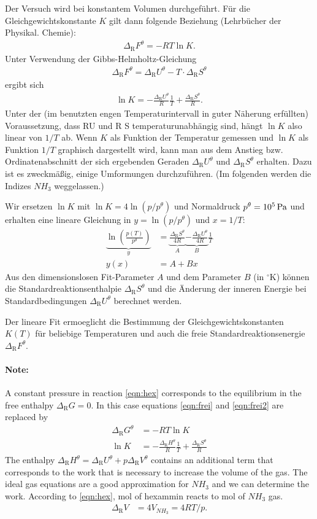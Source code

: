 \documentclass[english,twocolumn,DIV21,a4,10pt]{scrartcl}
\newcommand{\dr}{\Delta_\textrm{R}}
\begin{document}
Der Versuch wird bei konstantem Volumen durchgeführt. Für die
Gleichgewichtskonstante $K$ gilt dann folgende Beziehung (Lehrbücher
der Physikal. Chemie):
\begin{align}
  \label{eqn:frei}
  \dr F^\theta = -RT\ln K.
\end{align}
Unter Verwendung der Gibbs-Helmholtz-Gleichung
\begin{align}
  \label{eqn:frei2}
  \dr F^\theta = \dr U^\theta - T \cdot \dr S^\theta
\end{align}
ergibt sich
\begin{align}
  \ln K = -\frac{\dr U^\theta}{R}\frac{1}{T} + \frac{\dr S^\theta}{R}.
\end{align}
Unter der (im benutzten engen Temperaturintervall in guter Näherung
erfüllten) Voraussetzung, dass RU und R S temperaturunabhängig sind,
hängt $\ln K$ also linear von $1/T$ ab. Wenn $K$ als Funktion der
Temperatur gemessen und $\ln K$ als Funktion $1/T$ graphisch
dargestellt wird, kann man aus dem Anstieg bzw. Ordinatenabschnitt der
sich ergebenden Geraden $\dr U^\theta$ und $\dr S^\theta$
erhalten. Dazu ist es zweckmäßig, einige Umformungen
durchzuführen. (Im folgenden werden die Indizes $NH_3$ weggelassen.)

Wir ersetzen $\ln K$ mit $\ln K=4\ln(p/p^\theta)$ und Normaldruck
$p^\theta = \unit[10^5]{Pa}$ und erhalten eine lineare Gleichung in $y
= \ln(p/p^\theta)$ und $x=1/T$:
\begin{align}
  \label{eqn:fit}
  \underbrace{\ln \left(\frac{p(T)}{p^\theta}\right)}_y &= 
  \underbrace{\frac{\dr S^\theta}{4R}}_A \underbrace{-\frac{\dr U^\theta}{4R}}_B
  \frac{1}{T} \\
  y(x) &= A+B x
\end{align}
Aus den dimensionslosen Fit-Parameter $A$ und dem Parameter $B$ (in
${}^\circ\textrm{K}$) können die Standardreaktionsenthalpie $\dr
S^\theta$ und die \"Anderung der inneren Energie bei
Standardbedingungen $\dr U^\theta$ berechnet werden.

Der lineare Fit ermoeglicht die Bestimmung der
Gleichgewichtskonstanten $K(T)$ f\"ur beliebige Temperaturen und auch
die freie Standardreaktionsenergie $\dr F^\theta$.

\paragraph{Note:}
A constant pressure in reaction \ref{eqn:hex} corresponds to the
equilibrium in the free enthalpy $\dr G=0$. In this case equations
\eqref{eqn:frei} and \eqref{eqn:frei2} are replaced by
\begin{align}
  \dr G^\theta &= -RT \ln K \\
  \ln K &= - \frac{\dr H^\theta}{R} \frac{1}{T} + \frac{\dr S^\theta}{R}
\end{align}
The enthalpy $\dr H^\theta=\dr U^\theta + p \dr V^\theta$ contains an
additional term that corresponds to the work that is necessary to
increase the volume of the gas. The ideal gas equations are a good
approximation for $NH_3$ and we can determine the work. According to
\eqref{eqn:hex}, \unit[1]{mol} of hexammin reacts to \unit[4]{mol} of
$NH_3$ gas.
\begin{align}
  \dr V&= 4V_{NH_3}=4RT/p.
\end{align}
\end{document}
